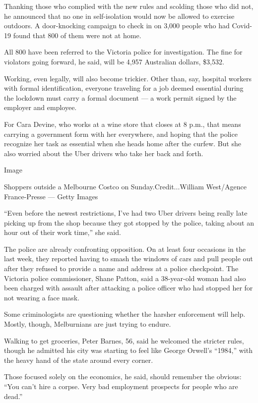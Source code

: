 Thanking those who complied with the new rules and scolding those who
did not, he announced that no one in self-isolation would now be allowed
to exercise outdoors. A door-knocking campaign to check in on 3,000
people who had Covid-19 found that 800 of them were not at home.

All 800 have been referred to the Victoria police for investigation. The
fine for violators going forward, he said, will be 4,957 Australian
dollars, \$3,532.

Working, even legally, will also become trickier. Other than, say,
hospital workers with formal identification, everyone traveling for a
job deemed essential during the lockdown must carry a formal document
--- a work permit signed by the employer and employee.

For Cara Devine, who works at a wine store that closes at 8 p.m., that
means carrying a government form with her everywhere, and hoping that
the police recognize her task as essential when she heads home after the
curfew. But she also worried about the Uber drivers who take her back
and forth.

Image

Shoppers outside a Melbourne Costco on Sunday.Credit...William
West/Agence France-Presse --- Getty Images

``Even before the newest restrictions, I've had two Uber drivers being
really late picking up from the shop because they got stopped by the
police, taking about an hour out of their work time,'' she said.

The police are already confronting opposition. On at least four
occasions in the last week, they reported having to smash the windows of
cars and pull people out after they refused to provide a name and
address at a police checkpoint. The Victoria police commissioner, Shane
Patton, said a 38-year-old woman had also been charged with assault
after attacking a police officer who had stopped her for not wearing a
face mask.

Some criminologists are questioning whether the harsher enforcement will
help. Mostly, though, Melburnians are just trying to endure.

Walking to get groceries, Peter Barnes, 56, said he welcomed the
stricter rules, though he admitted his city was starting to feel like
George Orwell's ``1984,'' with the heavy hand of the state around every
corner.

Those focused solely on the economics, he said, should remember the
obvious: ``You can't hire a corpse. Very bad employment prospects for
people who are dead.''

